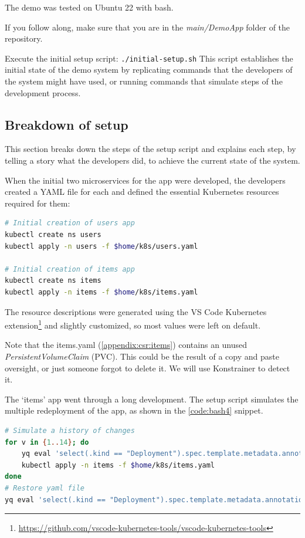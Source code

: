 The demo was tested on Ubuntu 22 with bash.

If you follow along, make sure that you are in the \emph{main/DemoApp} folder of the repository.

Execute the initial setup script: \lstinline|./initial-setup.sh| This script establishes the initial state of the demo system by replicating commands that the developers of the system might have used, or running commands that simulate steps of the development process.

\subsection{Breakdown of setup}

This section breaks down the steps of the setup script and explains each step, by telling a story what the developers did, to achieve the current state of the system.

When the initial two microservices for the app were developed, the developers created a YAML file for each and defined the essential Kubernetes resources required for them:

\begin{lstlisting}[caption={Create first deployment},language=bash,label=code:bash3]
# Initial creation of users app
kubectl create ns users
kubectl apply -n users -f $home/k8s/users.yaml

# Initial creation of items app
kubectl create ns items
kubectl apply -n items -f $home/k8s/items.yaml
\end{lstlisting}

The resource descriptions were generated using the VS Code Kubernetes extension\footnote{\url{https://github.com/vscode-kubernetes-tools/vscode-kubernetes-tools}} and slightly customized, so most values were left on default.

Note that the items.yaml (\ref{appendix:csr:items}) contains an unused \emph{PersistentVolumeClaim} (PVC). This could be the result of a copy and paste oversight, or just someone forgot to delete it. We will use Konstrainer to detect it.

The `items' app went through a long development. The setup script simulates the multiple redeployment of the app, as shown in the \ref{code:bash4} snippet.

\begin{lstlisting}[caption={Simulate redeployment of the `items' app},language=bash,label=code:bash4]
# Simulate a history of changes
for v in {1..14}; do
    yq eval 'select(.kind == "Deployment").spec.template.metadata.annotations.v = env(v)' $home/k8s/items.yaml -i
    kubectl apply -n items -f $home/k8s/items.yaml
done
# Restore yaml file
yq eval 'select(.kind == "Deployment").spec.template.metadata.annotations.v = "0"' $home/k8s/items.yaml -i
\end{lstlisting}

